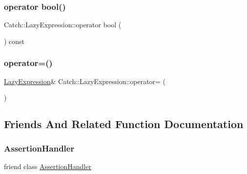 \subsubsection{\texorpdfstring{operator bool()}{operator bool()}}
{\footnotesize\ttfamily Catch\+::\+Lazy\+Expression\+::operator bool (\begin{DoxyParamCaption}{ }\end{DoxyParamCaption}) const\hspace{0.3cm}{\ttfamily [explicit]}}

\mbox{\label{class_catch_1_1_lazy_expression_ae4ae00d4f36f084c369f2da36565a822}} 
\subsubsection{\texorpdfstring{operator=()}{operator=()}}
{\footnotesize\ttfamily \mbox{\hyperlink{class_catch_1_1_lazy_expression}{Lazy\+Expression}}\& Catch\+::\+Lazy\+Expression\+::operator= (\begin{DoxyParamCaption}\item[{\mbox{\hyperlink{class_catch_1_1_lazy_expression}{Lazy\+Expression}} const \&}]{ }\end{DoxyParamCaption})\hspace{0.3cm}{\ttfamily [delete]}}



\subsection{Friends And Related Function Documentation}
\mbox{\label{class_catch_1_1_lazy_expression_a4301a3aa57b612dd8b6ef8461742ecab}} 
\subsubsection{\texorpdfstring{Assertion\+Handler}{AssertionHandler}}
{\footnotesize\ttfamily friend class \mbox{\hyperlink{class_catch_1_1_assertion_handler}{Assertion\+Handler}}\hspace{0.3cm}{\ttfamily [friend]}}

